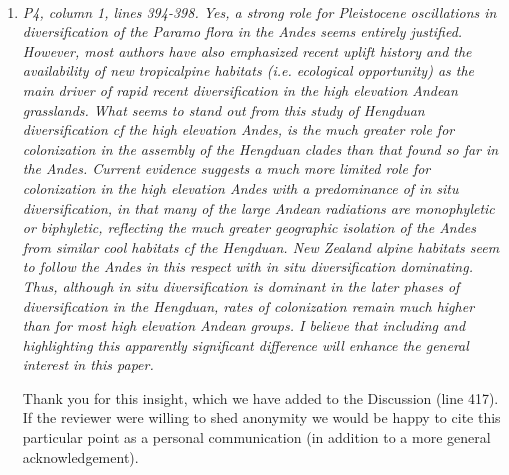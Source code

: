 \documentclass[11pt]{letter}
\begin{document}
\begin{letter}{ \\

}
\begin{enumerate}
  We agree that ``refugia'' is too restrictive a term in this
  context. We have edited this section (starting around line 340) to
  describe how topographic differences between the Hengduan Mountains
  and Himalayas (north-south vs east-west) lead to different
  expectations of persistence via migration during glacial cycles.

  
\item \textit{P4, column 1, lines 394-398. Yes, a strong role for
    Pleistocene oscillations in diversification of the Paramo flora in
    the Andes seems entirely justified. However, most authors have
    also emphasized recent uplift history and the availability of new
    tropicalpine habitats (i.e. ecological opportunity) as the main
    driver of rapid recent diversification in the high elevation
    Andean grasslands. What seems to stand out from this study of
    Hengduan diversification cf the high elevation Andes, is the much
    greater role for colonization in the assembly of the Hengduan
    clades than that found so far in the Andes.  Current evidence
    suggests a much more limited role for colonization in the high
    elevation Andes with a predominance of in situ diversification, in
    that many of the large Andean radiations are monophyletic or
    biphyletic, reflecting the much greater geographic isolation of
    the Andes from similar cool habitats cf the Hengduan. New Zealand
    alpine habitats seem to follow the Andes in this respect with in
    situ diversification dominating.  Thus, although in situ
    diversification is dominant in the later phases of diversification
    in the Hengduan, rates of colonization remain much higher than for
    most high elevation Andean groups. I believe that including and
    highlighting this apparently significant difference will enhance
    the general interest in this paper.}

  Thank you for this insight, which we have added to the Discussion
  (line 417). If the reviewer were willing to shed anonymity we would
  be happy to cite this particular point as a personal communication
  (in addition to a more general acknowledgement).


\end{enumerate}
\end{letter}
\end{document}
